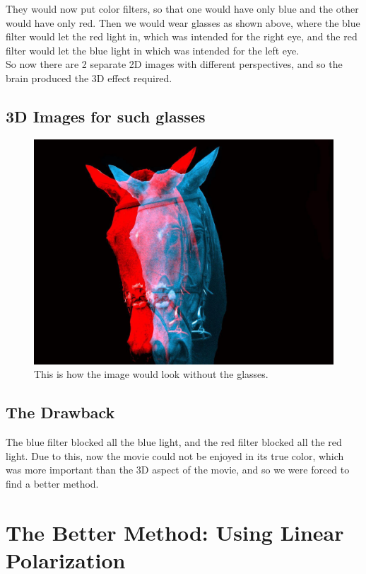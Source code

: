 \documentclass[11pt]{article}
\begin{document}
They would now put color filters, so that one would have only blue and the other would have only red. Then we would wear glasses as shown above, where the blue filter would let the red light in, which was intended for the right eye, and the red filter would let the blue light in which was intended for the left eye.\\ 

So now there are 2 separate 2D images with different perspectives, and so the brain produced the 3D effect required. 

\subsection{3D Images for such glasses}
\begin{figure}[H]
	\centering
	\includegraphics[scale=.15]{3D Glasses working 2.jpg}
	\caption{This is how the image would look without the glasses.}
	\label{fig:This figure}
\end{figure}
\subsection{The Drawback}
The blue filter blocked all the blue light, and the red filter blocked all the red light. Due to this, now the movie could not be enjoyed in its true color, which was more important than the 3D aspect of the movie, and so we were forced to find a better method. 

\section{The Better Method: Using Linear Polarization}
\end{document}
